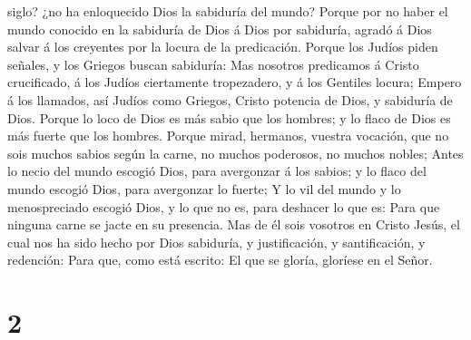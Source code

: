 siglo? ¿no ha enloquecido Dios la sabiduría del mundo? 
Porque por no haber el mundo conocido en la sabiduría de Dios á Dios por
sabiduría, agradó á Dios salvar á los creyentes por la locura de la
predicación.  Porque los Judíos piden señales, y los
Griegos buscan sabiduría:  Mas nosotros predicamos á Cristo
crucificado, á los Judíos ciertamente tropezadero, y á los Gentiles
locura;  Empero á los llamados, así Judíos como Griegos,
Cristo potencia de Dios, y sabiduría de Dios.  Porque lo
loco de Dios es más sabio que los hombres; y lo flaco de Dios es más
fuerte que los hombres.  Porque mirad, hermanos, vuestra
vocación, que no sois muchos sabios según la carne, no muchos poderosos,
no muchos nobles;  Antes lo necio del mundo escogió Dios,
para avergonzar á los sabios; y lo flaco del mundo escogió Dios, para
avergonzar lo fuerte;  Y lo vil del mundo y lo
menospreciado escogió Dios, y lo que no es, para deshacer lo que es:
 Para que ninguna carne se jacte en su presencia.
 Mas de él sois vosotros en Cristo Jesús, el cual nos ha
sido hecho por Dios sabiduría, y justificación, y santificación, y
redención:  Para que, como está escrito: El que se gloría,
gloríese en el Señor.

\hypertarget{section-1}{%
\section{2}\label{section-1}}

